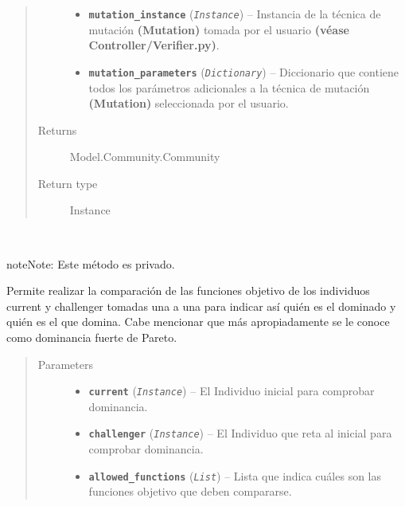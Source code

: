 \documentclass[letterpaper,10pt,english]{sphinxmanual}
\begin{document}
\begin{fulllineitems}
\begin{quote}
\begin{description}
\begin{itemize}
\item {} 
\textbf{\texttt{mutation\_instance}} (\emph{\texttt{Instance}}) -- Instancia de la técnica de mutación \textbf{(Mutation)} tomada por el usuario
\textbf{(véase Controller/Verifier.py)}.

\item {} 
\textbf{\texttt{mutation\_parameters}} (\emph{\texttt{Dictionary}}) -- Diccionario que contiene todos los parámetros adicionales a la técnica
de mutación \textbf{(Mutation)} seleccionada por el usuario.

\end{itemize}

\item[{Returns}] \leavevmode
Model.Community.Community

\item[{Return type}] \leavevmode
Instance

\end{description}\end{quote}

\begin{fulllineitems}
\label{Model/Community/Community:Model.Community.Community.Community._Community__compare_dominance}~
\begin{notice}{note}{Note:}
Este método es privado.
\end{notice}

Permite realizar la comparación de las funciones objetivo de los 
individuos current y challenger tomadas una a una para indicar así quién es el dominado y quién
es el que domina. Cabe mencionar que más apropiadamente se le conoce como dominancia
fuerte de Pareto.
\begin{quote}\begin{description}
\item[{Parameters}] \leavevmode\begin{itemize}
\item {} 
\textbf{\texttt{current}} (\emph{\texttt{Instance}}) -- El Individuo inicial para comprobar dominancia.

\item {} 
\textbf{\texttt{challenger}} (\emph{\texttt{Instance}}) -- El Individuo que reta al inicial para comprobar dominancia.

\item {} 
\textbf{\texttt{allowed\_functions}} (\emph{\texttt{List}}) -- Lista que indica cuáles son las funciones objetivo que deben 
compararse.


\end{itemize}
\end{description}
\end{quote}
\end{fulllineitems}
\end{fulllineitems}
\end{document}
